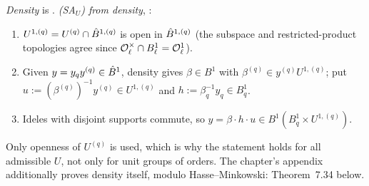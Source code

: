 \begin{outline}
\emph{Density} is \stcited{} \cite[Main Thm.~28.5.3, p.~485]{Vo}. \emph{(SA$_U$) from density}, \stproved:
\begin{enumerate}
\item $U^{1,(q)}=U^{(q)}\cap\hat{B}^{1,(q)}$ is open in $\hat{B}^{1,(q)}$ (the subspace and restricted-product topologies agree since
$\mathcal{O}_\ell^\times\cap B^1_\ell=\mathcal{O}_\ell^1$).
\item Given $y=y_qy^{(q)}\in\hat{B}^1$, density gives $\beta\in B^1$ with $\beta^{(q)}\in y^{(q)}U^{1,(q)}$; put
$u:=(\beta^{(q)})^{-1}y^{(q)}\in U^{1,(q)}$ and $h:=\beta_q^{-1}y_q\in B^1_q$.
\item Ideles with disjoint supports commute, so $y=\beta\cdot h\cdot u\in B^1(B^1_q\times U^{1,(q)})$.
\end{enumerate}
Only openness of $U^{(q)}$ is used, which is why the statement holds for all admissible $U$, not only for unit groups of orders.
The chapter's appendix additionally proves density itself, modulo Hasse--Minkowski: Theorem~7.34 below.
\end{outline}

